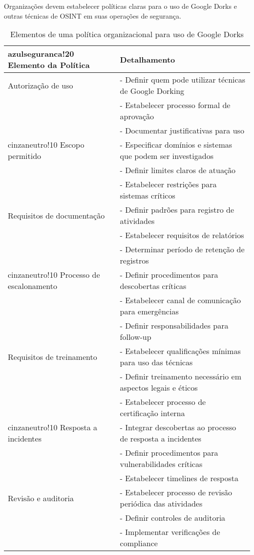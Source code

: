 \documentclass[12pt,a4paper]{book}
\begin{document}
Organizações devem estabelecer políticas claras para o uso de Google Dorks e outras técnicas de OSINT em suas operações de segurança.

\begin{table}[h]
\centering
\begin{tabular}{|p{4cm}|p{11cm}|}
\hline
{azulseguranca!20} \textbf{Elemento da Política} & \textbf{Detalhamento} \\
\hline
Autorização de uso & - Definir quem pode utilizar técnicas de Google Dorking \\
& - Estabelecer processo formal de aprovação \\
& - Documentar justificativas para uso \\
\hline
{cinzaneutro!10} Escopo permitido & - Especificar domínios e sistemas que podem ser investigados \\
& - Definir limites claros de atuação \\
& - Estabelecer restrições para sistemas críticos \\
\hline
Requisitos de documentação & - Definir padrões para registro de atividades \\
& - Estabelecer requisitos de relatórios \\
& - Determinar período de retenção de registros \\
\hline
{cinzaneutro!10} Processo de escalonamento & - Definir procedimentos para descobertas críticas \\
& - Estabelecer canal de comunicação para emergências \\
& - Definir responsabilidades para follow-up \\
\hline
Requisitos de treinamento & - Estabelecer qualificações mínimas para uso das técnicas \\
& - Definir treinamento necessário em aspectos legais e éticos \\
& - Estabelecer processo de certificação interna \\
\hline
{cinzaneutro!10} Resposta a incidentes & - Integrar descobertas ao processo de resposta a incidentes \\
& - Definir procedimentos para vulnerabilidades críticas \\
& - Estabelecer timelines de resposta \\
\hline
Revisão e auditoria & - Estabelecer processo de revisão periódica das atividades \\
& - Definir controles de auditoria \\
& - Implementar verificações de compliance \\
\hline
\end{tabular}
\caption{Elementos de uma política organizacional para uso de Google Dorks}
\end{table}
\end{document}
